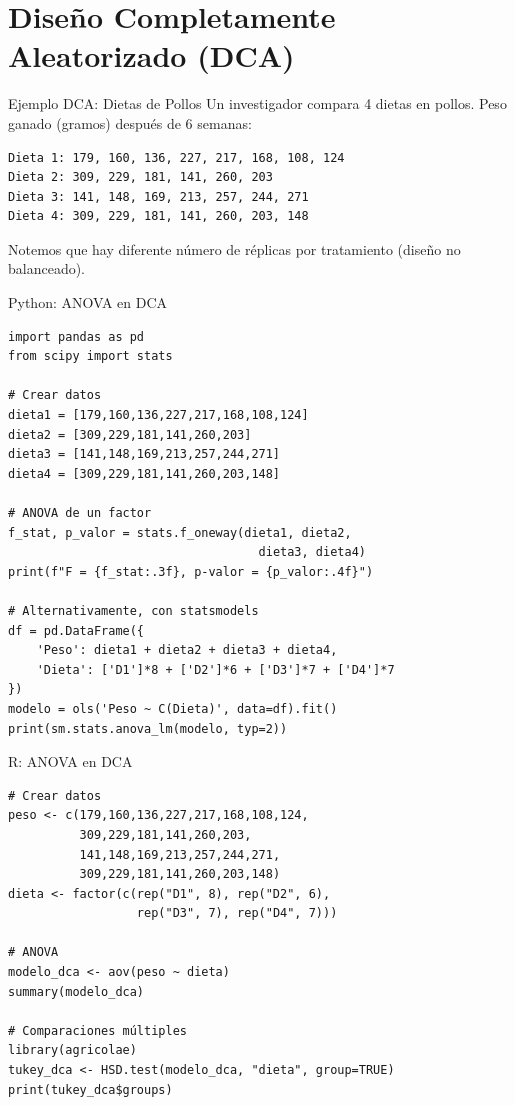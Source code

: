 \documentclass[aspectratio=169]{beamer}
\begin{document}
\section{Diseño Completamente Aleatorizado (DCA)}

\begin{frame}[fragile]{Ejemplo DCA: Dietas de Pollos}
\small
Un investigador compara 4 dietas en pollos. Peso ganado (gramos) después de 6 semanas:

\begin{verbatim}
Dieta 1: 179, 160, 136, 227, 217, 168, 108, 124
Dieta 2: 309, 229, 181, 141, 260, 203
Dieta 3: 141, 148, 169, 213, 257, 244, 271
Dieta 4: 309, 229, 181, 141, 260, 203, 148
\end{verbatim}

\vspace{0.2cm}
Notemos que hay diferente número de réplicas por tratamiento (diseño no balanceado).
\end{frame}

\begin{frame}[fragile]{Python: ANOVA en DCA}
\small
\begin{verbatim}
import pandas as pd
from scipy import stats

# Crear datos
dieta1 = [179,160,136,227,217,168,108,124]
dieta2 = [309,229,181,141,260,203]
dieta3 = [141,148,169,213,257,244,271]
dieta4 = [309,229,181,141,260,203,148]

# ANOVA de un factor
f_stat, p_valor = stats.f_oneway(dieta1, dieta2,
                                   dieta3, dieta4)
print(f"F = {f_stat:.3f}, p-valor = {p_valor:.4f}")

# Alternativamente, con statsmodels
df = pd.DataFrame({
    'Peso': dieta1 + dieta2 + dieta3 + dieta4,
    'Dieta': ['D1']*8 + ['D2']*6 + ['D3']*7 + ['D4']*7
})
modelo = ols('Peso ~ C(Dieta)', data=df).fit()
print(sm.stats.anova_lm(modelo, typ=2))
\end{verbatim}
\end{frame}

\begin{frame}[fragile]{R: ANOVA en DCA}
\small
\begin{verbatim}
# Crear datos
peso <- c(179,160,136,227,217,168,108,124,
          309,229,181,141,260,203,
          141,148,169,213,257,244,271,
          309,229,181,141,260,203,148)
dieta <- factor(c(rep("D1", 8), rep("D2", 6),
                  rep("D3", 7), rep("D4", 7)))

# ANOVA
modelo_dca <- aov(peso ~ dieta)
summary(modelo_dca)

# Comparaciones múltiples
library(agricolae)
tukey_dca <- HSD.test(modelo_dca, "dieta", group=TRUE)
print(tukey_dca$groups)
\end{verbatim}
\end{frame}
\end{document}
